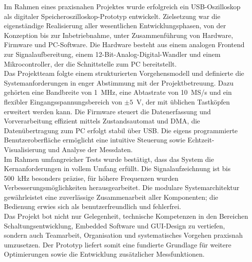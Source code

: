 \documentclass[a4paper, portrait, 12pt]{scrartcl} %
\begin{document}
Im Rahmen eines praxisnahen Projektes wurde erfolgreich ein USB-Oszilloskop als digitaler Speicheroszilloskop-Prototyp entwickelt. Zielsetzung war die eigenständige Realisierung aller wesentlichen Entwicklungsphasen, von der Konzeption bis zur Inbetriebnahme, unter Zusammenführung von Hardware, Firmware und PC-Software. Die Hardware besteht aus einem analogen Frontend zur Signalaufbereitung, einem 12-Bit-Analog-Digital-Wandler und einem Mikrocontroller, der die Schnittstelle zum PC bereitstellt.\\ 
Das Projektteam folgte einem strukturierten Vorgehensmodell und definierte die Systemanforderungen in enger Abstimmung mit der Projektbetreuung. Dazu gehörten eine Bandbreite von 1~MHz, eine Abtastrate von 10~MS/s und ein flexibler Eingangsspannungsbereich von $\pm5$~V, der mit üblichen Tastköpfen erweitert werden kann. Die Firmware steuert die Datenerfassung und Vorverarbeitung effizient mittels Zustandsautomat und DMA, die Datenübertragung zum PC erfolgt stabil über USB. Die eigens programmierte Benutzeroberfläche ermöglicht eine intuitive Steuerung sowie Echtzeit-Visualisierung und Analyse der Messdaten.\\ 
Im Rahmen umfangreicher Tests wurde bestätigt, dass das System die Kernanforderungen in vollem Umfang erfüllt. Die Signalaufzeichnung ist bis 500~kHz besonders präzise, für höhere Frequenzen wurden Verbesserungsmöglichkeiten herausgearbeitet. Die modulare Systemarchitektur gewährleistet eine zuverlässige Zusammenarbeit aller Komponenten; die Bedienung erwies sich als benutzerfreundlich und fehlerfrei.\\ 
Das Projekt bot nicht nur Gelegenheit, technische Kompetenzen in den Bereichen Schaltungsentwicklung, Embedded Software und GUI-Design zu vertiefen, sondern auch Teamarbeit, Organisation und systematisches Vorgehen praxisnah umzusetzen. Der Prototyp liefert somit eine fundierte Grundlage für weitere Optimierungen sowie die Entwicklung zusätzlicher Messfunktionen.
\pagebreak

\end{document}
